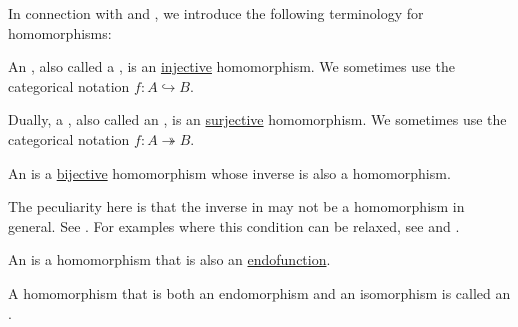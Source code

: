 \begin{definition}\label{def:first_order_homomorphism_invertibility}
  In connection with  and , we introduce the following terminology for homomorphisms:
  \begin{thmenum}
     An , also called a , is an \hyperref[def:function_invertibility/injective]{injective} homomorphism. We sometimes use the categorical notation \( f: A \hookrightarrow B \).

     Dually, a , also called an , is an \hyperref[def:function_invertibility/surjective]{surjective} homomorphism. We sometimes use the categorical notation \( f: A \twoheadrightarrow B \).

     An  is a \hyperref[def:function_invertibility/bijective]{bijective} homomorphism whose inverse is also a homomorphism.

    The peculiarity here is that the inverse in  may not be a homomorphism in general. See . For examples where this condition can be relaxed, see  and .

     An  is a homomorphism that is also an \hyperref[def:multi_valued_function/endofunction]{endofunction}.

     A homomorphism that is both an endomorphism and an isomorphism is called an .
  \end{thmenum}
\end{definition}

